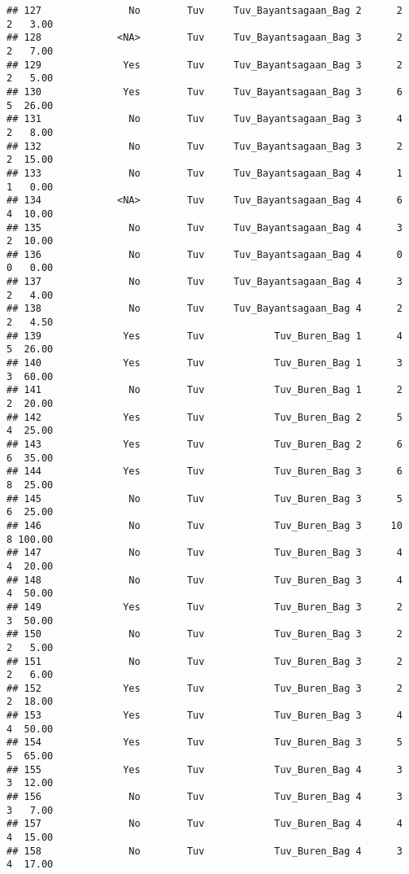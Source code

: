 \documentclass[
]{article}
\begin{document}
\begin{verbatim}
## 127               No        Tuv     Tuv_Bayantsagaan_Bag 2      2      2   3.00
## 128             <NA>        Tuv     Tuv_Bayantsagaan_Bag 3      2      2   7.00
## 129              Yes        Tuv     Tuv_Bayantsagaan_Bag 3      2      2   5.00
## 130              Yes        Tuv     Tuv_Bayantsagaan_Bag 3      6      5  26.00
## 131               No        Tuv     Tuv_Bayantsagaan_Bag 3      4      2   8.00
## 132               No        Tuv     Tuv_Bayantsagaan_Bag 3      2      2  15.00
## 133               No        Tuv     Tuv_Bayantsagaan_Bag 4      1      1   0.00
## 134             <NA>        Tuv     Tuv_Bayantsagaan_Bag 4      6      4  10.00
## 135               No        Tuv     Tuv_Bayantsagaan_Bag 4      3      2  10.00
## 136               No        Tuv     Tuv_Bayantsagaan_Bag 4      0      0   0.00
## 137               No        Tuv     Tuv_Bayantsagaan_Bag 4      3      2   4.00
## 138               No        Tuv     Tuv_Bayantsagaan_Bag 4      2      2   4.50
## 139              Yes        Tuv            Tuv_Buren_Bag 1      4      5  26.00
## 140              Yes        Tuv            Tuv_Buren_Bag 1      3      3  60.00
## 141               No        Tuv            Tuv_Buren_Bag 1      2      2  20.00
## 142              Yes        Tuv            Tuv_Buren_Bag 2      5      4  25.00
## 143              Yes        Tuv            Tuv_Buren_Bag 2      6      6  35.00
## 144              Yes        Tuv            Tuv_Buren_Bag 3      6      8  25.00
## 145               No        Tuv            Tuv_Buren_Bag 3      5      6  25.00
## 146               No        Tuv            Tuv_Buren_Bag 3     10      8 100.00
## 147               No        Tuv            Tuv_Buren_Bag 3      4      4  20.00
## 148               No        Tuv            Tuv_Buren_Bag 3      4      4  50.00
## 149              Yes        Tuv            Tuv_Buren_Bag 3      2      3  50.00
## 150               No        Tuv            Tuv_Buren_Bag 3      2      2   5.00
## 151               No        Tuv            Tuv_Buren_Bag 3      2      2   6.00
## 152              Yes        Tuv            Tuv_Buren_Bag 3      2      2  18.00
## 153              Yes        Tuv            Tuv_Buren_Bag 3      4      4  50.00
## 154              Yes        Tuv            Tuv_Buren_Bag 3      5      5  65.00
## 155              Yes        Tuv            Tuv_Buren_Bag 4      3      3  12.00
## 156               No        Tuv            Tuv_Buren_Bag 4      3      3   7.00
## 157               No        Tuv            Tuv_Buren_Bag 4      4      4  15.00
## 158               No        Tuv            Tuv_Buren_Bag 4      3      4  17.00

\end{verbatim}
\end{document}
